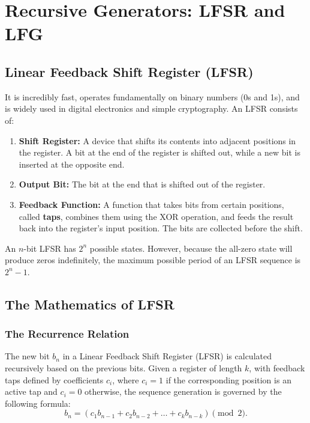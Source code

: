 \section{Recursive Generators: LFSR and LFG}

\subsection{Linear Feedback Shift Register (LFSR)}

It is incredibly fast, operates fundamentally on binary numbers (0s and 1s), and is widely used in digital electronics and simple cryptography. An LFSR consists of:

\begin{enumerate}
    \item \textbf{Shift Register:} A device that shifts its contents into adjacent positions in the register. A bit at the end of the register is shifted out, while a new bit is inserted at the opposite end.

    \item \textbf{Output Bit:} The bit at the end that is shifted out of the register.

    \item \textbf{Feedback Function:} A function that takes bits from certain positions, called \textbf{taps}, combines them using the XOR operation, and feeds the result back into the register's input position. The bits are collected before the shift.
\end{enumerate}

An $n$-bit LFSR has $2^n$ possible states. However, because the all-zero state will produce zeros indefinitely, the maximum possible period of an LFSR sequence is $2^n-1$.

\subsection{The Mathematics of LFSR}

\subsubsection{The Recurrence Relation}

The new bit $b_n$ in a Linear Feedback Shift Register (LFSR) is calculated recursively based on the previous bits. Given a register of length $k$, with feedback taps defined by coefficients $c_i$, where $c_i=1$ if the corresponding position is an active tap and $c_i=0$ otherwise, the sequence generation is governed by the following formula:
\[
b_n = \left(c_1b_{n-1}+c_2b_{n-2}+\dots+c_kb_{n-k}\right)\pmod 2.
\]

